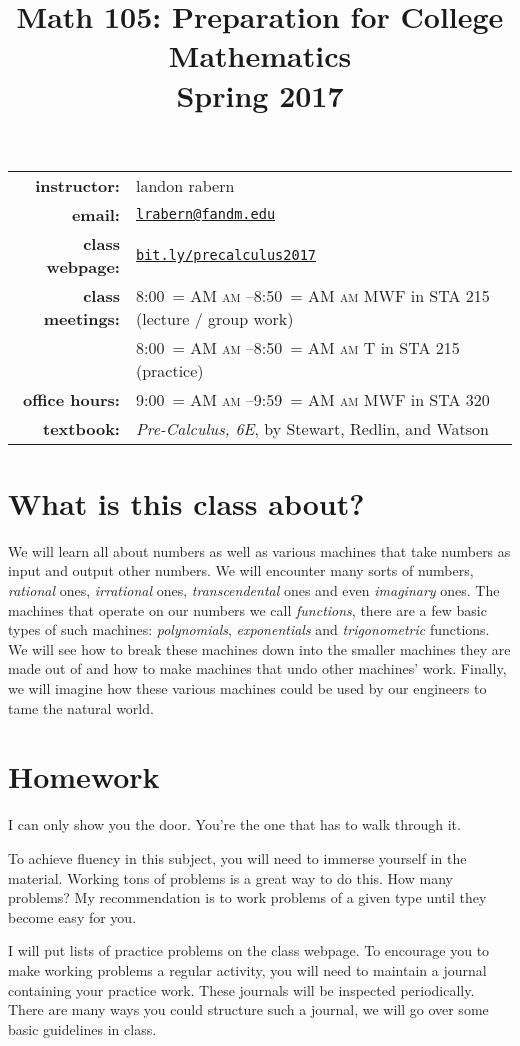 \documentclass[12pt]{article}
\title{Math 105: Preparation for College Mathematics\\ \bigskip\small{Spring 2017}}
\date{}
\makeatletter
\DeclareRobustCommand{\maybefakesc}[1]{%
  \ifnum\pdfstrcmp{\f@series}{\bfdefault}=\z@
    {\fontsize{\dimexpr0.8\dimexpr\f@size pt\relax}{0}\selectfont\uppercase{#1}}%
  \else
    \textsc{#1}%
  \fi
}
\newcommand\AM{\,\maybefakesc{am}\xspace}
\makeatother
\begin{document}
\maketitle

\begin{tabular}{r l}
\textbf{instructor:}& landon rabern\\
\textbf{email:}& \href{mailto:lrabern@fandm.edu}{\nolinkurl{lrabern@fandm.edu}}\\
\textbf{class webpage:}& \href{http://bit.ly/precalculus2017}{\nolinkurl{bit.ly/precalculus2017}}\\
\textbf{class meetings:}& 8:00\AM--8:50\AM MWF in STA 215 (lecture / group work)\\
& 8:00\AM--8:50\AM T in STA 215 (practice)\\
\textbf{office hours:}& 9:00\AM--9:59\AM MWF in STA 320\\
\textbf{textbook:}& \textit{Pre-Calculus, 6E}, by Stewart, Redlin, and Watson\\
\end{tabular}

\section*{What is this class about?}
We will learn all about numbers as well as various machines that take numbers as input and output other numbers.
We will encounter many sorts of numbers, \emph{rational} ones, \emph{irrational} ones, \emph{transcendental} ones and even \emph{imaginary} ones. 
The machines that operate on our numbers we call \emph{functions}, there are a few basic types of such machines: \emph{polynomials}, \emph{exponentials} and \emph{trigonometric} functions.
We will see how to break these machines down into the smaller machines they are made out of and how to make machines that undo other machines' work.  Finally, we will 
imagine how these various machines could be used by our engineers to tame the natural world.
\section*{Homework} 
\epigraph{I can only show you the door. You're the one that has to walk through it.}{}
To achieve fluency in this subject, you will need to immerse yourself in the material.  
Working tons of problems is a great way to do this.  How many problems?  
My recommendation is to work problems of a given type until they become easy for you.

I will put lists of practice problems on the class webpage. 
To encourage you to make working problems a regular activity, you will need to maintain a journal containing your practice work.
These journals will be inspected periodically.  There are many ways you could structure such a journal, we will go over some
basic guidelines in class.
\end{document}
